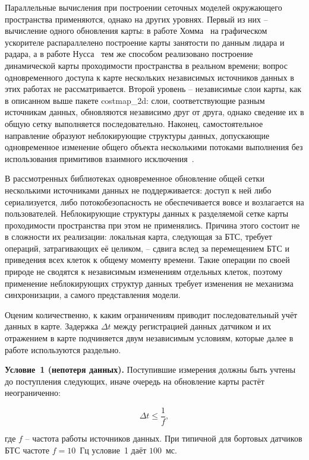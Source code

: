 Параллельные вычисления при построении сеточных моделей окружающего пространства применяются, однако на других уровнях. Первый из них -- вычисление одного обновления карты: в работе Хомма~\cite{homm2010efficient} на графическом ускорителе распараллелено построение карты занятости по данным лидара и радара, а в работе Нусса~\cite{nuss2018random} тем же способом реализовано построение динамической карты проходимости пространства в реальном времени; вопрос одновременного доступа к карте нескольких независимых источников данных в этих работах не рассматривается. Второй уровень -- независимые слои карты, как в описанном выше пакете costmap\_2d: слои, соответствующие разным источникам данных, обновляются независимо друг от друга, однако сведение их в общую сетку выполняется последовательно. Наконец, самостоятельное направление образуют неблокирующие структуры данных, допускающие одновременное изменение общего объекта несколькими потоками выполнения без использования примитивов взаимного исключения~\cite{michael1996simple, ArtOfMpP}.

В рассмотренных библиотеках одновременное обновление общей сетки несколькими источниками данных не поддерживается: доступ к ней либо сериализуется, либо потокобезопасность не обеспечивается вовсе и возлагается на пользователей. Неблокирующие структуры данных к разделяемой сетке карты проходимости пространства при этом не применялись. Причина этого состоит не в сложности их реализации: локальная карта, следующая за БТС, требует операций, затрагивающих её целиком, -- сдвига вслед за перемещением БТС и приведения всех клеток к общему моменту времени. Такие операции по своей природе не сводятся к независимым изменениям отдельных клеток, поэтому применение неблокирующих структур данных требует изменения не механизма синхронизации, а самого представления модели.

Оценим количественно, к каким ограничениям приводит последовательный учёт данных в карте. Задержка $\Delta t$ между регистрацией данных датчиком и их отражением в карте подчиняется двум независимым условиям, которые далее в работе используются раздельно.

\textbf{Условие~1 (непотеря данных).} Поступившие измерения должны быть учтены до поступления следующих, иначе очередь на обновление карты растёт неограниченно:

\begin{equation}
	\Delta t \le \frac{1}{f},
	\label{eq:dt_rate}
\end{equation}

где $f$ -- частота работы источников данных. При типичной для бортовых датчиков БТС частоте $f = 10$~Гц условие~1 даёт $100$~мс.

